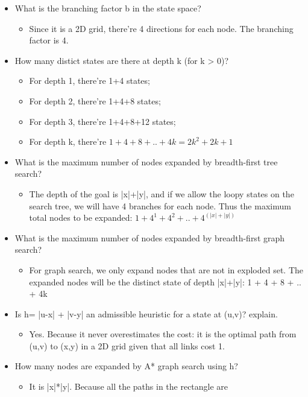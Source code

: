 \begin{itemize}
\item What is the branching factor b in the state space?
  \begin{itemize}
  \item Since it is a 2D grid, there're 4 directions for each node. The branching factor is 4.
  \end{itemize}
\item How many distict states are there at depth k (for k > 0)?
  \begin{itemize}
  \item For depth 1, there're 1+4 states;
  \item For depth 2, there're 1+4+8 states;
  \item For depth 3, there're 1+4+8+12 states;
  \item For depth k, there're $1 + 4 + 8 + .. + 4k = 2k^2 + 2k + 1$
  \end{itemize}
\item What is the maximum number of nodes expanded by breadth-first
  tree search?
  \begin{itemize}
  \item The depth of the goal is |x|+|y|, and if we allow the loopy
    states on the search tree, we will have 4 branches for each
    node. Thus the maximum total nodes to be expanded:
    $1 + 4^1 + 4^2 + .. + 4^(|x|+|y|)$
  \end{itemize}
\item What is the maximum number of nodes expanded by breadth-first
  graph search?
  \begin{itemize}
  \item For graph search, we only expand nodes that are not in
    exploded set.  The expanded nodes will be the distinct state of
    depth |x|+|y|: 1 + 4 + 8 + .. + 4k
  \end{itemize}
\item Is h= |u-x| + |v-y| an admissible heuristic for a state at
  (u,v)? explain.
  \begin{itemize}
  \item Yes. Because it never overestimates the cost: it is the
    optimal path from (u,v) to (x,y) in a 2D grid given that all links
    cost 1.
  \end{itemize}
\item How many nodes are expanded by A* graph search using h?
  \begin{itemize}
  \item It is |x|*|y|. Because all the paths in the rectangle are

\end{itemize}
\end{itemize}
